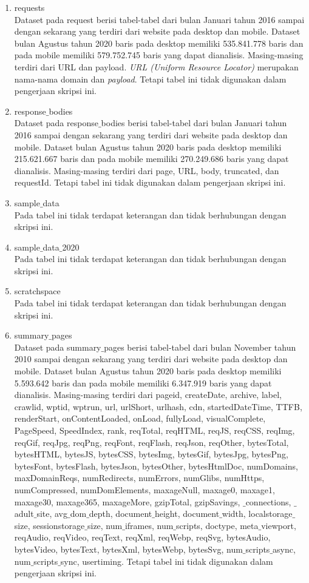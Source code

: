 \begin{enumerate}
\item requests\\
Dataset pada request berisi tabel-tabel dari bulan Januari tahun 2016 sampai dengan sekarang yang terdiri dari website pada desktop dan mobile. Dataset bulan Agustus tahun 2020 baris pada desktop memiliki 535.841.778 baris dan pada mobile memiliki 579.752.745 baris yang dapat dianalisis. Masing-masing terdiri dari URL dan payload. \textit{URL (Uniform Resource Locator)} merupakan nama-nama domain dan \textit{payload}. Tetapi tabel ini tidak digunakan dalam pengerjaan skripsi ini.
\item response$\_$bodies\\
Dataset pada response$\_$bodies berisi tabel-tabel dari bulan Januari tahun 2016 sampai dengan sekarang yang terdiri dari website pada desktop dan mobile. Dataset bulan Agustus tahun 2020 baris pada desktop memiliki 215.621.667 baris dan pada mobile memiliki 270.249.686 baris yang dapat dianalisis. Masing-masing terdiri dari page, URL, body, truncated, dan requestId. Tetapi tabel ini tidak digunakan dalam pengerjaan skripsi ini.
\item sample$\_$data\\
Pada tabel ini tidak terdapat keterangan dan tidak berhubungan dengan skripsi ini.
\item sample$\_$data$\_$2020\\
Pada tabel ini tidak terdapat keterangan dan tidak berhubungan dengan skripsi ini.
\item scratchspace\\
Pada tabel ini tidak terdapat keterangan dan tidak berhubungan dengan skripsi ini.
\item summary$\_$pages\\
Dataset pada summary$\_$pages berisi tabel-tabel dari bulan November tahun 2010 sampai dengan sekarang yang terdiri dari website pada desktop dan mobile. Dataset bulan Agustus tahun 2020 baris pada desktop memiliki 5.593.642 baris dan pada mobile memiliki 6.347.919 baris yang dapat dianalisis. Masing-masing terdiri dari pageid, createDate, archive, label, crawlid, wptid, wptrun, url, urlShort, urlhash, cdn, startedDateTime, TTFB, renderStart, onContentLoaded, onLoad, fullyLoad, visualComplete, PageSpeed, SpeedIndex, rank, reqTotal, reqHTML, reqJS, reqCSS, reqImg, reqGif, reqJpg, reqPng, reqFont, reqFlash, reqJson, reqOther, bytesTotal, bytesHTML, bytesJS, bytesCSS, bytesImg, bytesGif, bytesJpg, bytesPng, bytesFont, bytesFlash, bytesJson, bytesOther, bytesHtmlDoc, numDomains, maxDomainReqs, numRedirects, numErrors, numGlibs, numHttps, numCompressed, numDomElements, maxageNull, maxage0, maxage1, maxage30, maxage365, maxageMore, gzipTotal, gzipSavings, $\_$connections, $\_$adult$\_$site, avg$\_$dom$\_$depth, document$\_$height, document$\_$width, localstorage$\_$size, sessionstorage$\_$size, num$\_$iframes, num$\_$scripts, doctype, meta$\_$viewport, reqAudio, reqVideo, reqText, reqXml, reqWebp, reqSvg, bytesAudio, bytesVideo, bytesText, bytesXml, bytesWebp, bytesSvg, num$\_$scripts$\_$async, num$\_$scripts$\_$sync, usertiming. Tetapi tabel ini tidak digunakan dalam pengerjaan skripsi ini.

\end{enumerate}
